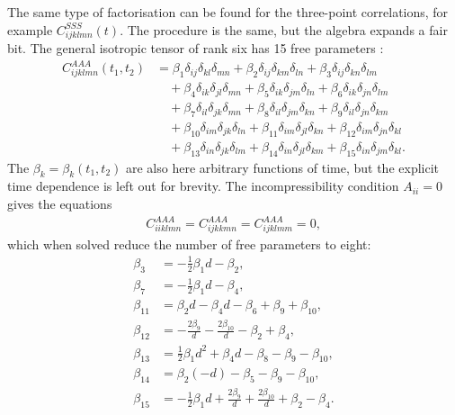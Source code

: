 \documentclass[thesis.tex]{subfiles}
\begin{document}
The same type of factorisation can be found for the three-point correlations, for example $C^{SSS}_{ijklmn}(t)$. The procedure is the same, but the algebra expands a fair bit.
The general isotropic tensor of rank six has 15 free parameters \cite{andrews1977}:
\begin{align*}
	C^{AAA}_{ijklmn}(t_1,t_2) &=
		\beta_{1} \delta_{ij}\delta_{kl}\delta_{mn} +  
		\beta_{2} \delta_{ij}\delta_{km}\delta_{ln} +  
		\beta_{3} \delta_{ij}\delta_{kn}\delta_{lm} \\&\quad+ 
		\beta_{4} \delta_{ik}\delta_{jl}\delta_{mn} +  
		\beta_{5} \delta_{ik}\delta_{jm}\delta_{ln} +  
		\beta_{6} \delta_{ik}\delta_{jn}\delta_{lm} \\&\quad+  
		\beta_{7} \delta_{il}\delta_{jk}\delta_{mn} +  
		\beta_{8} \delta_{il}\delta_{jm}\delta_{kn} +  
		\beta_{9} \delta_{il}\delta_{jn}\delta_{km} \\&\quad+  
		\beta_{10}\delta_{im}\delta_{jk}\delta_{ln} +  
		\beta_{11}\delta_{im}\delta_{jl}\delta_{kn} +  
		\beta_{12}\delta_{im}\delta_{jn}\delta_{kl} \\&\quad+  
		\beta_{13}\delta_{in}\delta_{jk}\delta_{lm} +  
		\beta_{14}\delta_{in}\delta_{jl}\delta_{km} +  
		\beta_{15}\delta_{in}\delta_{jm}\delta_{kl}.
\end{align*}
The $\beta_k=\beta_k(t_1,t_2)$ are also here arbitrary functions of time, but the explicit time dependence is left out for brevity. The incompressibility condition $A_{ii}=0$ gives the equations
\begin{align*}
	C^{AAA}_{iiklmn} =C^{AAA}_{ijkkmn} =C^{AAA}_{ijklmm} =0,
\end{align*}
which when solved reduce the number of free parameters to eight:
\begin{align*}
\beta_{3}&=-\frac{1}{2} \beta_{1} d-\beta_{2},\\
\beta_{7}&=-\frac{1}{2} \beta_{1} d-\beta_{4},\\
\beta_{11}&=\beta_{2} d-\beta_{4} d-\beta_{6}+\beta_{9}+\beta_{10},\\
\beta_{12}&=-\frac{2 \beta_{9}}{d}-\frac{2
\beta_{10}}{d}-\beta_{2}+\beta_{4},\\
\beta_{13}&=\frac{1}{2} \beta_{1} d^2+\beta_{4} d-\beta_{8}-\beta_{9}-\beta_{10},\\
\beta_{14}&=\beta_{2} (-d)-\beta_{5}-\beta_{9}-\beta_{10},\\
\beta_{15}&=-\frac{1}{2} \beta_{1} d+\frac{2 \beta_{9}}{d}+\frac{2
\beta_{10}}{d}+\beta_{2}-\beta_{4}.
\end{align*}
\end{document}
